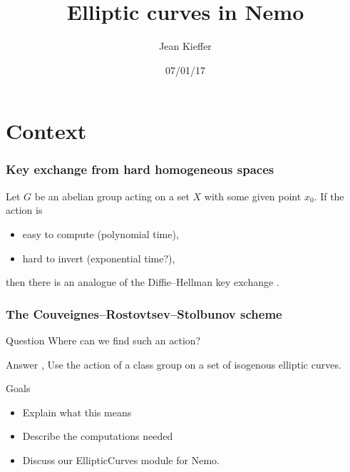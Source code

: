 \documentclass[12pt]{beamer}
\title{Elliptic curves in Nemo}
\date{07/01/17}
\author{Jean Kieffer}
\institute{\'Ecole normale sup\'erieure de Paris \& INRIA}
\begin{document}
\frame[plain]{\titlepage}

\frame{\tableofcontents}

\section{Context}

\begin{frame}
 \frametitle{Key exchange from hard homogeneous spaces}
 Let $G$ be an abelian group acting on a set $X$ with some given point $x_0$. If the action is
 \begin{itemize}
  \pause
  \item easy to compute (polynomial time),
  \pause
  \item hard to invert (exponential time?),
  \pause
 \end{itemize}
 then there is an analogue of the Diffie--Hellman key exchange \cite{Couv}.
 
 \vspace{-5mm}
 \begin{center}
 \end{center}
\end{frame}

\begin{frame}
 \frametitle{The Couveignes--Rostovtsev--Stolbunov scheme}
 
 \begin{alertblock}{Question}
  Where can we find such an action?
 \end{alertblock}
 
 \pause
 
 \begin{block}{Answer \cite{Couv}, \cite{RoSt}}
  Use the action of a class group on a set of isogenous elliptic curves.
 \end{block}
 
 \pause
 
 \begin{block}{Goals}
   \begin{itemize}
    \item Explain what this means
    \item Describe the computations needed
    \item Discuss our EllipticCurves module for Nemo.
   \end{itemize}
 \end{block}
\end{frame}
\end{document}
